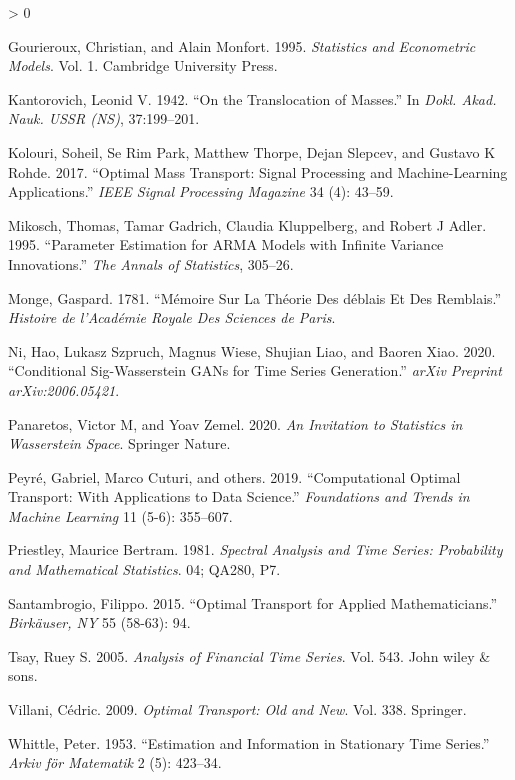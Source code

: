 \documentclass[
  11pt,
]{article}
\newlength{\cslhangindent}
\newenvironment{CSLReferences}[2] %
 {%
  \setlength{\parindent}{0pt}
  \ifodd #1 \everypar{\setlength{\hangindent}{\cslhangindent}}\ignorespaces\fi
  \ifnum #2 > 0
  \setlength{\parskip}{#2\baselineskip}
  \fi
 }%
 {}
\begin{document}
\begin{CSLReferences}{1}{0}
\leavevmode\hypertarget{ref-gourieroux1995statistics}{}%
Gourieroux, Christian, and Alain Monfort. 1995. \emph{Statistics and
Econometric Models}. Vol. 1. Cambridge University Press.

\leavevmode\hypertarget{ref-kantorovich1942translocation}{}%
Kantorovich, Leonid V. 1942. {``On the Translocation of Masses.''} In
\emph{Dokl. Akad. Nauk. USSR (NS)}, 37:199--201.

\leavevmode\hypertarget{ref-kolouri2017optimal}{}%
Kolouri, Soheil, Se Rim Park, Matthew Thorpe, Dejan Slepcev, and Gustavo
K Rohde. 2017. {``Optimal Mass Transport: Signal Processing and
Machine-Learning Applications.''} \emph{IEEE Signal Processing Magazine}
34 (4): 43--59.

\leavevmode\hypertarget{ref-mikosch1995parameter}{}%
Mikosch, Thomas, Tamar Gadrich, Claudia Kluppelberg, and Robert J Adler.
1995. {``Parameter Estimation for ARMA Models with Infinite Variance
Innovations.''} \emph{The Annals of Statistics}, 305--26.

\leavevmode\hypertarget{ref-monge1781memoire}{}%
Monge, Gaspard. 1781. {``M{é}moire Sur La Th{é}orie Des d{é}blais Et Des
Remblais.''} \emph{Histoire de l'Acad{é}mie Royale Des Sciences de
Paris}.

\leavevmode\hypertarget{ref-ni2020conditional}{}%
Ni, Hao, Lukasz Szpruch, Magnus Wiese, Shujian Liao, and Baoren Xiao.
2020. {``Conditional Sig-Wasserstein GANs for Time Series Generation.''}
\emph{arXiv Preprint arXiv:2006.05421}.

\leavevmode\hypertarget{ref-panaretos2020invitation}{}%
Panaretos, Victor M, and Yoav Zemel. 2020. \emph{An Invitation to
Statistics in Wasserstein Space}. Springer Nature.

\leavevmode\hypertarget{ref-peyre2019computational}{}%
Peyré, Gabriel, Marco Cuturi, and others. 2019. {``Computational Optimal
Transport: With Applications to Data Science.''} \emph{Foundations and
Trends in Machine Learning} 11 (5-6): 355--607.

\leavevmode\hypertarget{ref-priestley1981spectral}{}%
Priestley, Maurice Bertram. 1981. \emph{Spectral Analysis and Time
Series: Probability and Mathematical Statistics}. 04; QA280, P7.

\leavevmode\hypertarget{ref-santambrogio2015optimal}{}%
Santambrogio, Filippo. 2015. {``Optimal Transport for Applied
Mathematicians.''} \emph{Birk{ä}user, NY} 55 (58-63): 94.

\leavevmode\hypertarget{ref-tsay2005analysis}{}%
Tsay, Ruey S. 2005. \emph{Analysis of Financial Time Series}. Vol. 543.
John wiley \& sons.

\leavevmode\hypertarget{ref-villani2009optimal}{}%
Villani, Cédric. 2009. \emph{Optimal Transport: Old and New}. Vol. 338.
Springer.

\leavevmode\hypertarget{ref-whittle1953estimation}{}%
Whittle, Peter. 1953. {``Estimation and Information in Stationary Time
Series.''} \emph{Arkiv f{ö}r Matematik} 2 (5): 423--34.

\end{CSLReferences}
\end{document}
